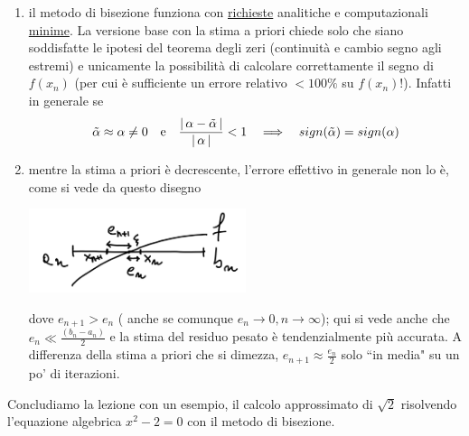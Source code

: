 \begin{enumerate}[label=\Alph*)]
\item il metodo di bisezione funziona con \uline{richieste} analitiche e computazionali \uline{minime}.
La versione base con la stima a priori chiede solo che siano soddisfatte le ipotesi del teorema degli zeri (continuità e cambio segno agli estremi) e unicamente la possibilità di calcolare correttamente il segno di $f(x_n)$ (per cui è sufficiente un errore relativo $<100\%$ su $f(x_n)!$). Infatti in generale se 
\[\tilde{\alpha} \approx \alpha \ne 0 \quad \text{e} \quad \frac{\lvert\,\alpha-\tilde{\alpha}\,\rvert}{\lvert\,\alpha\,\rvert}<1 \quad \Longrightarrow \quad sign(\tilde{\alpha})=sign(\alpha)\]

\item mentre la stima a priori è decrescente, l'errore effettivo in generale non lo è, come si vede da questo disegno
\begin{center}
    \includegraphics[width=0.5\textwidth]{foto/grafo3}\par
\end{center}
 dove $e_{n+1}>e_n$ ( anche se comunque $e_n \rightarrow 0, n \rightarrow \infty$); qui si vede anche che $e_n\ll\frac{(b_n-a_n)}{2}$ e la stima del residuo pesato è tendenzialmente più accurata. A differenza della stima a priori che si dimezza, $e_{n+1}\approx\frac{e_n}{2}$ solo ``in media" su un po' di iterazioni.
\end{enumerate}

Concludiamo la lezione con un esempio, il calcolo approssimato di $\sqrt{2}$ risolvendo l'equazione algebrica $x^2 -2 = 0$ con il metodo di bisezione.\newline

